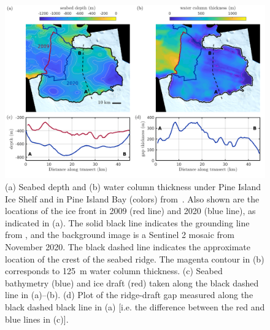 \documentclass[draft]{agujournal2019}
\begin{document}
\begin{figure}
    \centering
    \includegraphics[width = \textwidth]{plots/figure1.png}
    \caption{(a) Seabed depth and (b) water column thickness under Pine Island Ice Shelf and in Pine Island Bay (colors) from~. Also shown are the locations of the ice front in 2009 (red line) and 2020 (blue line), as indicated in (a).  The solid black line indicates the grounding line from , and the background image is a Sentinel 2 mosaic from November 2020. The black dashed line indicates the approximate location of the crest of the seabed ridge. The magenta contour in (b) corresponds to 125~m  water column thickness. (c) Seabed bathymetry (blue) and ice draft (red) taken along the black dashed line in (a)--(b). (d) Plot of the ridge-draft gap measured along the black dashed black line in (a) [i.e. the difference between the red and blue lines in (c)]. }
    \label{fig:figure1}
\end{figure}
\end{document}
